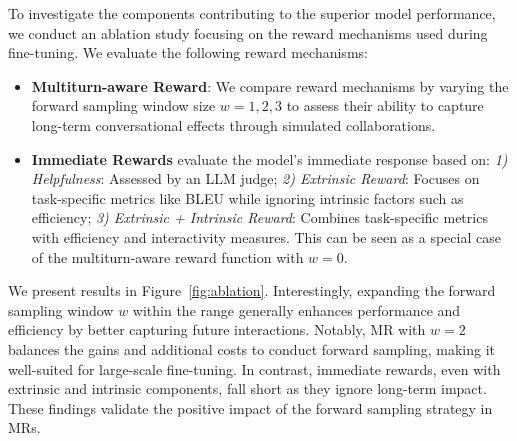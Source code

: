 To investigate the components contributing to the superior model performance, we conduct an ablation study focusing on the reward mechanisms used during fine-tuning. 
We evaluate the following reward mechanisms:
\begin{itemize}%
    \item \textbf{Multiturn-aware Reward}: We compare reward mechanisms by varying the forward sampling window size $w=1,2,3$ to assess their ability to capture long-term conversational effects through simulated collaborations.
     \item \textbf{Immediate Rewards} evaluate the model's immediate response based on:
        \textit{1) Helpfulness}: Assessed by an LLM judge;
        \textit{2) Extrinsic Reward}: Focuses on task-specific metrics like BLEU while ignoring intrinsic factors such as efficiency;
        \textit{3) Extrinsic + Intrinsic Reward}: Combines task-specific metrics with efficiency and interactivity measures. This can be seen as a special case of the multiturn-aware reward function with $w=0$.
    
    
\end{itemize}




We present results in Figure~\ref{fig:ablation}.
Interestingly,
expanding the forward sampling window $w$ within the range generally enhances performance and efficiency by better capturing future interactions. Notably, MR with $w=2$ balances the gains and additional costs to conduct forward sampling, making it well-suited for large-scale fine-tuning. In contrast, immediate rewards, even with extrinsic and intrinsic components, fall short as they ignore long-term impact. 
These findings validate the positive impact of the forward sampling strategy in MRs.

